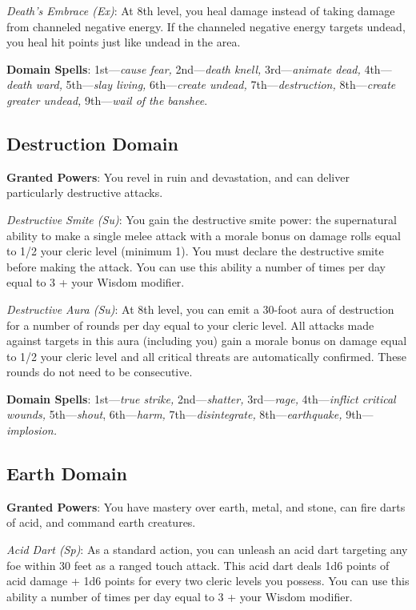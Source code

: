 \textit{Death's Embrace (Ex)}: At 8th level, you heal damage instead of taking damage from channeled negative energy.
    If the channeled negative energy targets undead, you heal hit points just like undead in the area.

\textbf{Domain Spells}: 1st---\textit{cause fear, }2nd---\textit{death knell, }3rd---\textit{animate dead, }4th---\textit{death ward, }5th---\textit{slay living, }6th---\textit{create undead, }7th---\textit{destruction, }8th---\textit{create greater undead, }9th---\textit{wail of the banshee}. 

\subsection{Destruction Domain}


\textbf{Granted Powers}: You revel in ruin and devastation, and can deliver particularly destructive attacks.

\textit{Destructive Smite (Su)}: You gain the destructive smite power: the supernatural ability to make a single
melee attack with a morale bonus on damage rolls equal to 1/2 your cleric level (minimum 1). You must declare the
destructive smite before making the attack. You can use this ability a number of times per day equal to 3 + your
Wisdom modifier.

\textit{Destructive Aura (Su)}: At 8th level, you can emit a 30-foot aura of destruction for a number of rounds
per day equal to your cleric level. All attacks made against targets in this aura (including you) gain a morale
bonus on damage equal to 1/2 your cleric level and all critical threats are automatically confirmed. These rounds
do not need to be consecutive.
				
\textbf{Domain Spells}: 1st---\textit{true strike, }2nd---\textit{shatter, }3rd---\textit{rage, }4th---\textit{inflict critical wounds, }5th---\textit{shout}, 6th---\textit{harm, }7th---\textit{disintegrate, }8th---\textit{earthquake, }9th---\textit{implosion.}
				
\subsection{Earth Domain}

				
\textbf{Granted Powers}: You have mastery over earth, metal, and stone, can fire darts of acid, and command earth
creatures.
				
\textit{Acid Dart (Sp)}: As a standard action, you can unleash an acid dart targeting any foe within 30 feet as a
ranged touch attack. This acid dart deals 1d6 points of acid damage + 1d6 points for every two cleric levels you 
possess. You can use this ability a number of times per day equal to 3 + your Wisdom modifier. 
				

